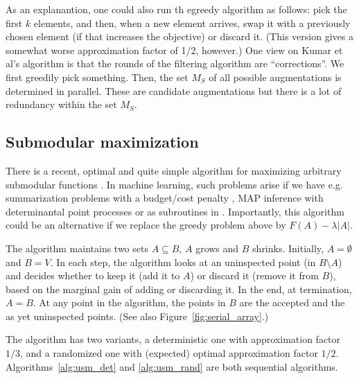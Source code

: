 \documentclass{article}
\begin{document}
As an explanantion, one could also run th egreedy algorithm as follows: pick the first $k$ elements, and then, when a new element arrives, swap it with a previously chosen element (if that increases the objective) or discard it. (This version gives a somewhat worse approximation factor of 1/2, however.)
One view on Kumar et al's algorithm is that the rounds of the filtering algorithm are ``corrections''. We first greedily pick something. Then, the set $M_S$ of all possible augmentations is determined in parallel. These are candidate augmentations but there is a lot of redundancy within the set $M_S$.


\subsection{Submodular maximization}
There is a recent, optimal and quite simple algorithm for maximizing arbitrary submodular functions \citep{buchbinder12}. In machine learning, such problems arise if we have e.g. summarization problems with a budget/cost penalty \citep{krause08}, MAP inference with determinantal point processes \citep{gillenwater12} or as subroutines in \citep{reed13}. Importantly, this algorithm could be an alternative if we replace the greedy problem above by $F(A) - \lambda |A|$.

The algorithm maintains two sets $A \subseteq B$, $A$ grows and $B$ shrinks. Initially, $A = \emptyset$ and $B = V$.
In each step, the algorithm looks at an uninspected point (in $B \setminus A$) and decides whether to keep it (add it to $A$) or discard it (remove it from $B$), based on the marginal gain of adding or discarding it. In the end, at termination, $A = B$. At any point in the algorithm, the points in $B$ are the accepted and the as yet uninspected points. (See also Figure~\ref{fig:serial_array}.)

The algorithm has two variants, a deterministic one with approximation factor $1/3$, and a randomized one with (expected) optimal approximation factor $1/2$. Algorithms~\ref{alg:usm_det} and \ref{alg:usm_rand} are both sequential algorithms.
\end{document}
